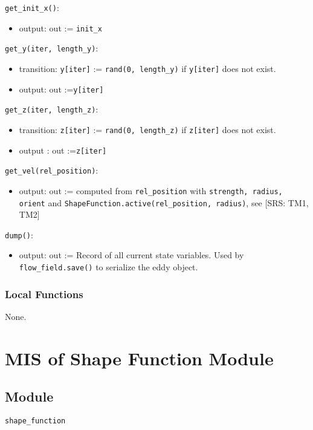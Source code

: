 \documentclass[12pt, titlepage]{article}
\begin{document}
\noindent \texttt{get\_init\_x()}:
\begin{itemize}
  \item output: out := \texttt{init\_x}
\end{itemize}

\noindent \texttt{get\_y(iter, length\_y)}:
\begin{itemize}
  \item transition: \texttt{y[iter]} := \texttt{rand(0, length\_y)} if \texttt{y[iter]} does not exist.
  \item output: out :=\texttt{y[iter]}
\end{itemize}

\noindent \texttt{get\_z(iter, length\_z)}:
\begin{itemize}
  \item transition: \texttt{z[iter]} := \texttt{rand(0, length\_z)} if \texttt{z[iter]} does not exist.
  \item output
  : out :=\texttt{z[iter]}
\end{itemize}
\noindent \texttt{get\_vel(rel\_position)}:
\begin{itemize}
  \item output: out := computed from \texttt{rel\_position} with \texttt{strength, radius, orient} and \texttt{ShapeFunction.active(rel\_position, radius)}, see [SRS: TM1, TM2]
\end{itemize}

\noindent \texttt{dump()}:
\begin{itemize}
\item output: out := Record of all current state variables. Used by \texttt{flow\_field.save()} to serialize the eddy object.
\end{itemize}

\subsubsection{Local Functions}

None.


\newpage
\section{MIS of Shape Function Module} \label{mShape}

\subsection{Module}
\texttt{shape\_function}
\end{document}
